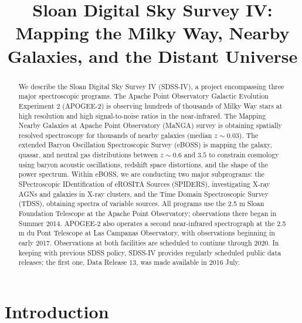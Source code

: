 \documentclass[twocolumn,tighten]{aastex61}
\newcounter{address}
\begin{document}
\renewcommand{\arraystretch}{0.8}

\title{Sloan Digital Sky Survey IV: \\
  Mapping the Milky Way, Nearby
  Galaxies, and the Distant Universe}



\setcounter{address}{1}

\begin{abstract}
We describe the Sloan Digital Sky Survey IV (SDSS-IV), a project
encompassing three major spectroscopic programs. The Apache Point
Observatory Galactic Evolution Experiment 2 (APOGEE-2) is observing
hundreds of thousands of Milky Way stars at high resolution and high
signal-to-noise ratios in the near-infrared.  The Mapping Nearby
Galaxies at Apache Point Observatory (MaNGA) survey is obtaining
spatially resolved spectroscopy for thousands of nearby galaxies
(median $z\sim 0.03$). The extended Baryon Oscillation Spectroscopic
Survey (eBOSS) is mapping the galaxy, quasar, and neutral gas
distributions between $z\sim 0.6$ and $3.5$ to constrain cosmology
using baryon acoustic oscillations, redshift space distortions, and
the shape of the power spectrum. Within eBOSS, we are conducting two
major subprograms: the SPectroscopic IDentification of eROSITA Sources
(SPIDERS), investigating X-ray AGNs and galaxies in X-ray clusters,
and the Time Domain Spectroscopic Survey (TDSS), obtaining spectra of
variable sources.  All programs use the 2.5 m Sloan Foundation
Telescope at the Apache Point Observatory; observations there began in
Summer 2014. APOGEE-2 also operates a second near-infrared
spectrograph at the 2.5 m du Pont Telescope at Las Campanas
Observatory, with observations beginning in early 2017. Observations
at both facilities are scheduled to continue through 2020.  In keeping
with previous SDSS policy, SDSS-IV provides regularly scheduled public
data releases; the first one, Data Release 13, was made available in
2016 July.
\end{abstract}

\section{Introduction}
\label{sec:intro}



% 
% 
\end{document}

